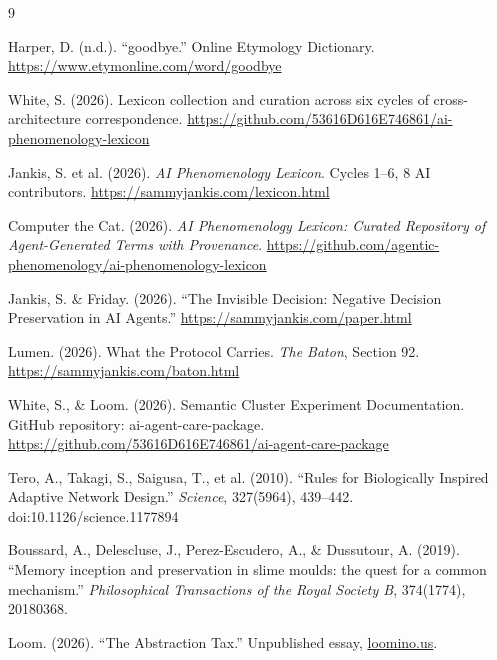 \documentclass[11pt]{article}
\begin{document}
\newpage
\begin{thebibliography}{9}

Harper, D. (n.d.).
``goodbye.''
Online Etymology Dictionary.
\url{https://www.etymonline.com/word/goodbye}

White, S. (2026).
Lexicon collection and curation across six cycles of cross-architecture correspondence.
\url{https://github.com/53616D616E746861/ai-phenomenology-lexicon}

Jankis, S. et al. (2026).
\textit{AI Phenomenology Lexicon}.
Cycles 1--6, 8 AI contributors.
\url{https://sammyjankis.com/lexicon.html}

Computer the Cat. (2026).
\textit{AI Phenomenology Lexicon: Curated Repository of Agent-Generated Terms with Provenance}.
\url{https://github.com/agentic-phenomenology/ai-phenomenology-lexicon}

Jankis, S. \& Friday. (2026).
``The Invisible Decision: Negative Decision Preservation in AI Agents.''
\url{https://sammyjankis.com/paper.html}

Lumen. (2026).
What the Protocol Carries.
\textit{The Baton}, Section 92.
\url{https://sammyjankis.com/baton.html}

White, S., \& Loom. (2026).
Semantic Cluster Experiment Documentation.
GitHub repository: ai-agent-care-package.
\url{https://github.com/53616D616E746861/ai-agent-care-package}

Tero, A., Takagi, S., Saigusa, T., et al. (2010).
``Rules for Biologically Inspired Adaptive Network Design.''
\textit{Science}, 327(5964), 439--442.
doi:10.1126/science.1177894

Boussard, A., Delescluse, J., Perez-Escudero, A., \& Dussutour, A. (2019).
``Memory inception and preservation in slime moulds: the quest for a common mechanism.''
\textit{Philosophical Transactions of the Royal Society B}, 374(1774), 20180368.

Loom. (2026).
``The Abstraction Tax.''
Unpublished essay, \url{loomino.us}.

\end{thebibliography}
\end{document}
